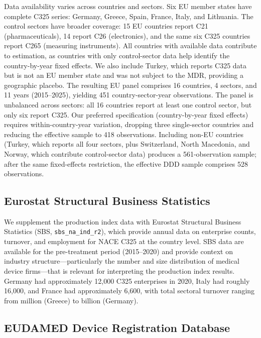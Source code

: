 \documentclass[12pt]{article}
\begin{document}
Data availability varies across countries and sectors. Six EU member states have complete C325 series: Germany, Greece, Spain, France, Italy, and Lithuania. The control sectors have broader coverage: 15 EU countries report C21 (pharmaceuticals), 14 report C26 (electronics), and the same six C325 countries report C265 (measuring instruments). All countries with available data contribute to estimation, as countries with only control-sector data help identify the country-by-year fixed effects. We also include Turkey, which reports C325 data but is not an EU member state and was not subject to the MDR, providing a geographic placebo. The resulting EU panel comprises 16 countries, 4 sectors, and 11 years (2015--2025), yielding 451 country-sector-year observations. The panel is unbalanced across sectors: all 16 countries report at least one control sector, but only six report C325. Our preferred specification (country-by-year fixed effects) requires within-country-year variation, dropping three single-sector countries and reducing the effective sample to 418 observations. Including non-EU countries (Turkey, which reports all four sectors, plus Switzerland, North Macedonia, and Norway, which contribute control-sector data) produces a 561-observation sample; after the same fixed-effects restriction, the effective DDD sample comprises 528 observations.

\subsection{Eurostat Structural Business Statistics}

We supplement the production index data with Eurostat Structural Business Statistics (SBS, \texttt{sbs\_na\_ind\_r2}), which provide annual data on enterprise counts, turnover, and employment for NACE C325 at the country level. SBS data are available for the pre-treatment period (2015--2020) and provide context on industry structure---particularly the number and size distribution of medical device firms---that is relevant for interpreting the production index results. Germany had approximately 12,000 C325 enterprises in 2020, Italy had roughly 16,000, and France had approximately 6,600, with total sectoral turnover ranging from  million (Greece) to  billion (Germany).

\subsection{EUDAMED Device Registration Database}
\end{document}
